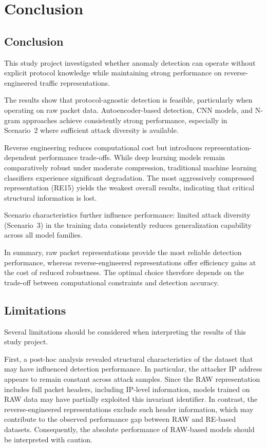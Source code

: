 \chapter{Conclusion}
\label{chap:conclusion}



\section{Conclusion}

This study project investigated whether anomaly detection can operate
without explicit protocol knowledge while maintaining strong
performance on reverse-engineered traffic representations.

The results show that protocol-agnostic detection is feasible,
particularly when operating on raw packet data.
Autoencoder-based detection, \ac{CNN} models, and N-gram approaches
achieve consistently strong performance, especially in
Scenario~2 where sufficient attack diversity is available.

Reverse engineering reduces computational cost but introduces
representation-dependent performance trade-offs.
While deep learning models remain comparatively robust under
moderate compression, traditional machine learning classifiers
experience significant degradation.
The most aggressively compressed representation (RE15) yields
the weakest overall results, indicating that critical structural
information is lost.

Scenario characteristics further influence performance:
limited attack diversity (Scenario~3) in the training data consistently reduces
generalization capability across all model families.

In summary, raw packet representations provide the most reliable
detection performance, whereas reverse-engineered representations
offer efficiency gains at the cost of reduced robustness.
The optimal choice therefore depends on the trade-off between
computational constraints and detection accuracy.

\section{Limitations}

Several limitations should be considered when interpreting the
results of this study project.

First, a post-hoc analysis revealed structural characteristics of
the dataset that may have influenced detection performance.
In particular, the attacker \ac{IP} address appears to remain constant
across attack samples. Since the RAW representation includes full
packet headers, including \ac{IP}-level information, models trained on
RAW data may have partially exploited this invariant identifier.
In contrast, the reverse-engineered representations exclude such
header information, which may contribute to the observed performance
gap between RAW and RE-based datasets. Consequently, the absolute
performance of RAW-based models should be interpreted with caution.

